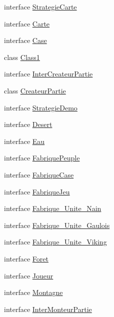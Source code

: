 \begin{DoxyCompactItemize}
\item 
interface \hyperlink{interface_code___small_world_1_1_strategie_carte}{Strategie\-Carte}
\item 
interface \hyperlink{interface_code___small_world_1_1_carte}{Carte}
\item 
interface \hyperlink{interface_code___small_world_1_1_case}{Case}
\item 
class \hyperlink{class_code___small_world_1_1_class1}{Class1}
\item 
interface \hyperlink{interface_code___small_world_1_1_inter_createur_partie}{Inter\-Createur\-Partie}
\item 
class \hyperlink{class_code___small_world_1_1_createur_partie}{Createur\-Partie}
\item 
interface \hyperlink{interface_code___small_world_1_1_strategie_demo}{Strategie\-Demo}
\item 
interface \hyperlink{interface_code___small_world_1_1_desert}{Desert}
\item 
interface \hyperlink{interface_code___small_world_1_1_eau}{Eau}
\item 
interface \hyperlink{interface_code___small_world_1_1_fabrique_peuple}{Fabrique\-Peuple}
\item 
interface \hyperlink{interface_code___small_world_1_1_fabrique_case}{Fabrique\-Case}
\item 
interface \hyperlink{interface_code___small_world_1_1_fabrique_jeu}{Fabrique\-Jeu}
\item 
interface \hyperlink{interface_code___small_world_1_1_fabrique___unite___nain}{Fabrique\-\_\-\-Unite\-\_\-\-Nain}
\item 
interface \hyperlink{interface_code___small_world_1_1_fabrique___unite___gaulois}{Fabrique\-\_\-\-Unite\-\_\-\-Gaulois}
\item 
interface \hyperlink{interface_code___small_world_1_1_fabrique___unite___viking}{Fabrique\-\_\-\-Unite\-\_\-\-Viking}
\item 
interface \hyperlink{interface_code___small_world_1_1_foret}{Foret}
\item 
interface \hyperlink{interface_code___small_world_1_1_joueur}{Joueur}
\item 
interface \hyperlink{interface_code___small_world_1_1_montagne}{Montagne}
\item 
interface \hyperlink{interface_code___small_world_1_1_inter_monteur_partie}{Inter\-Monteur\-Partie}
\item 

\end{DoxyCompactItemize}
